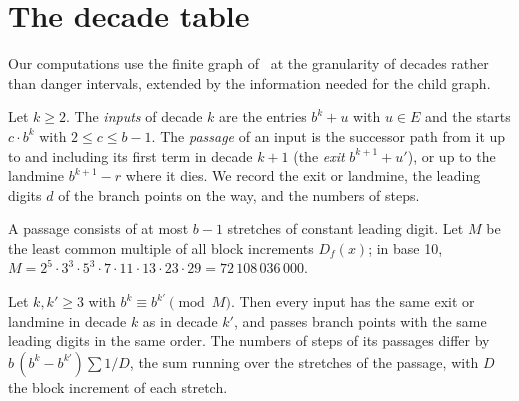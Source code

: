 \section{The decade table}
\label{sec:table}

Our computations use the finite graph of~\cite{dbts} at the granularity of decades rather than
danger intervals, extended by the information needed for the child graph.

\begin{definition}
  Let $k \ge 2$. The \emph{inputs} of decade $k$ are the entries $b^k + u$ with $u \in E$ and the
  starts $c \cdot b^k$ with $2 \le c \le b - 1$. The \emph{passage} of an input is the successor
  path from it up to and including its first term in decade $k + 1$ (the \emph{exit}
  $b^{k+1} + u'$), or up to the landmine $b^{k+1} - r$ where it dies. We record the exit or
  landmine, the leading digits $d$ of the branch points on the way, and the numbers of steps.
\end{definition}

A passage consists of at most $b - 1$ stretches of constant leading digit. Let $M$ be the least
common multiple of all block increments $D_f(x)$; in base 10,
$M = 2^5 \cdot 3^3 \cdot 5^3 \cdot 7 \cdot 11 \cdot 13 \cdot 23 \cdot 29 = 72\,108\,036\,000$.

\begin{lemma}
  \label{lem:reduction}
  Let $k, k' \ge 3$ with $b^k \equiv b^{k'} \pmod M$. Then every input has the same exit or landmine
  in decade $k$ as in decade $k'$, and passes branch points with the same leading digits in the
  same order. The numbers of steps of its passages differ by $b\,(b^k - b^{k'}) \sum 1/D$, the sum
  running over the stretches of the passage, with $D$ the block increment of each stretch.
\end{lemma}

